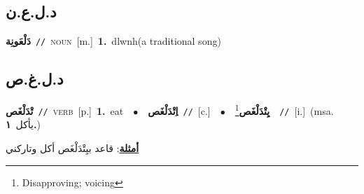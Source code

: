\documentclass[10pt,a4paper,twoside]{article} %
\begin{document}
\begin{multicols}{2}
\vspace{-3mm}
\subsection*{\color{blue}\foreignlanguage{arabic}{د.ل.ع.ن}\color{blue}{ (ntws)}} 

{\setlength\topsep{0pt}\textbf{\foreignlanguage{arabic}{دَلْعَونِة}}\ {\color{gray}\texttt{//}\color{black}}\ \textsc{noun}\ [m.]\ \textbf{1.}~dlwnh(a traditional song)\ } \vspace{2mm}

\vspace{-3mm}
\subsection*{\color{blue}\foreignlanguage{arabic}{د.ل.غ.ص}\color{blue}{}} 

{\setlength\topsep{0pt}\textbf{\foreignlanguage{arabic}{تْدَلْغَص}}\ {\color{gray}\texttt{//}\color{black}}\ \textsc{verb}\ [p.]\ \textbf{1.}~eat\ \ $\bullet$\ \ \setlength\topsep{0pt}\textbf{\foreignlanguage{arabic}{اِتْدَلْغَص}}\ {\color{gray}\texttt{//}\color{black}}\ [c.]\ \ $\bullet$\ \ \setlength\topsep{0pt}\textbf{\foreignlanguage{arabic}{يِتْدَلْغَص}}\footnote{Disapproving; voicing}\ \ {\color{gray}\texttt{//}\color{black}}\ [i.]\ \color{gray}(msa. \foreignlanguage{arabic}{يأكل}~\foreignlanguage{arabic}{\textbf{١.}})\color{black}\  \begin{flushright}\color{gray}\foreignlanguage{arabic}{\textbf{\underline{\foreignlanguage{arabic}{أمثلة}}}: قاعد بيِتْدَلْغَص أكل وتاركني}\end{flushright}\color{black}} \vspace{2mm}


\end{multicols}
\end{document}
